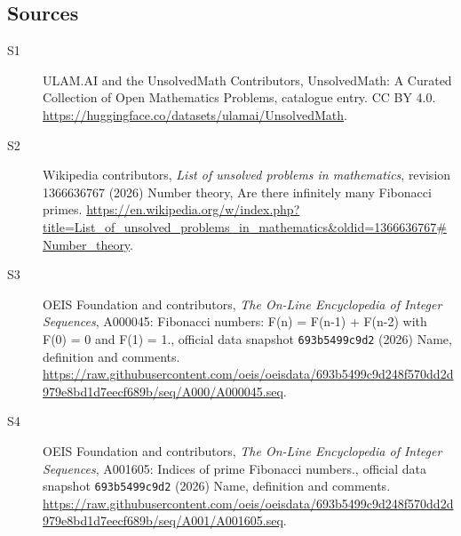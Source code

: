 \documentclass[11pt]{article}
\begin{document}
\subsection{Sources}
\begin{description}
\item[\hypertarget{source:statement:1}{S1}] ULAM.AI and the UnsolvedMath Contributors, UnsolvedMath: A Curated Collection of Open Mathematics Problems, catalogue entry. CC BY 4.0. \url{https://huggingface.co/datasets/ulamai/UnsolvedMath}.
\item[\hypertarget{source:statement:2}{S2}] Wikipedia contributors, \emph{List of unsolved problems in mathematics}, revision 1366636767 (2026) Number theory, Are there infinitely many Fibonacci primes. \url{https://en.wikipedia.org/w/index.php?title=List_of_unsolved_problems_in_mathematics&oldid=1366636767#Number_theory}.
\item[\hypertarget{source:statement:3}{S3}] OEIS Foundation and contributors, \emph{The On-Line Encyclopedia of Integer Sequences}, A000045: Fibonacci numbers: F(n) = F(n-1) + F(n-2) with F(0) = 0 and F(1) = 1., official data snapshot \texttt{693b5499c9d2} (2026) Name, definition and comments. \url{https://raw.githubusercontent.com/oeis/oeisdata/693b5499c9d248f570dd2d979e8bd1d7eecf689b/seq/A000/A000045.seq}.
\item[\hypertarget{source:statement:4}{S4}] OEIS Foundation and contributors, \emph{The On-Line Encyclopedia of Integer Sequences}, A001605: Indices of prime Fibonacci numbers., official data snapshot \texttt{693b5499c9d2} (2026) Name, definition and comments. \url{https://raw.githubusercontent.com/oeis/oeisdata/693b5499c9d248f570dd2d979e8bd1d7eecf689b/seq/A001/A001605.seq}.
\end{description}
\label{end:statement}
\end{document}
